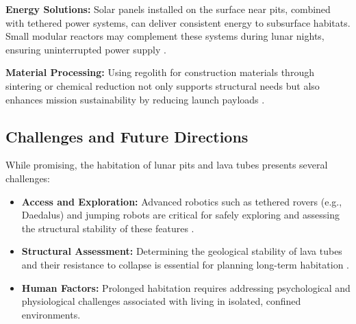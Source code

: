 \textbf{Energy Solutions:}  
Solar panels installed on the surface near pits, combined with tethered power systems, can deliver consistent energy to subsurface habitats. Small modular reactors may complement these systems during lunar nights, ensuring uninterrupted power supply \cite{lro}.

\textbf{Material Processing:}  
Using regolith for construction materials through sintering or chemical reduction not only supports structural needs but also enhances mission sustainability by reducing launch payloads \cite{jsanders-isru}.

\subsection{Challenges and Future Directions}

While promising, the habitation of lunar pits and lava tubes presents several challenges:
\begin{itemize}
    \item \textbf{Access and Exploration:} Advanced robotics such as tethered rovers (e.g., Daedalus) and jumping robots are critical for safely exploring and assessing the structural stability of these features \cite{esa-daedalus}.
    \item \textbf{Structural Assessment:} Determining the geological stability of lava tubes and their resistance to collapse is essential for planning long-term habitation \cite{sublunear-lava}.
    \item \textbf{Human Factors:} Prolonged habitation requires addressing psychological and physiological challenges associated with living in isolated, confined environments.
\end{itemize}

